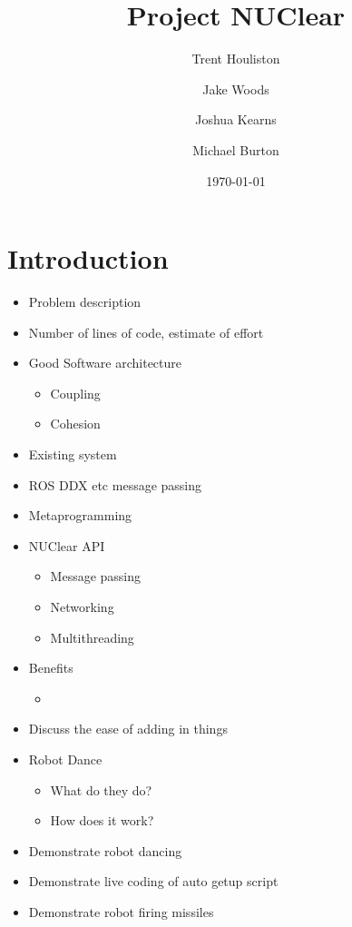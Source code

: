 \documentclass{beamer}
\title[Short title]{Project NUClear}
\author{
	Trent Houliston \and Jake Woods \and Joshua Kearns \and Michael Burton
}
\institute[UoN]
{
	University of Newcastle \\ %
	\medskip
	\textit{Trent.Houliston@uon.edu.au, Jake.f.woods@gmail.com} %
}
\date{\today}
\begin{document}
\begin{frame}
	\titlepage %
\end{frame}

\begin{frame}
	\tableofcontents
\end{frame}

\section{Introduction}
\begin{frame}
\end{frame}

\begin{itemize}
	\item Problem description
	\item Number of lines of code, estimate of effort
	\item Good Software architecture
	\begin{itemize}
		\item Coupling
		\item Cohesion
	\end{itemize}
	\item Existing system
	\item ROS DDX etc message passing
	\item Metaprogramming
	\item NUClear API
	\begin{itemize}
		\item Message passing
		\item Networking
		\item Multithreading
	\end{itemize}
	\item Benefits
	\begin{itemize}
		\item 
	\end{itemize}
	\item Discuss the ease of adding in things
	\item Robot Dance
	\begin{itemize}
		\item What do they do?
		\item How does it work?
	\end{itemize}
	\item Demonstrate robot dancing
	\item Demonstrate live coding of auto getup script
	\item Demonstrate robot firing missiles
\end{itemize}
\end{document}
